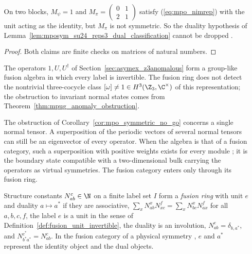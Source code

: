 \begin{lemma}%
    \label{lem:mposym_reps3_non_dual}
    \leanok
    On two blocks, $M_\psi=1$ and
    $M_\pi=\begin{pmatrix}0&1\\2&1\end{pmatrix}$ satisfy
    (\ref{eq:mpo_nimrep}) with the unit acting as the identity, but $M_\pi$
    is not symmetric. So the duality hypothesis of
    Lemma~\ref{lem:mposym_su24_reps3_dual_classification} cannot be dropped
    \cite{gap:glm23_reps3_su24_module_list}.
\end{lemma}

\begin{proof}
    \leanok
    Both claims are finite checks on matrices of natural numbers.
\end{proof}

\begin{example}%
    \label{ex:mpo_symmetry_z3}
    \leanok
    The operators $1,U,U^\dagger$ of
    Section~\ref{sec:asymex_z3anomalous} form a group-like fusion algebra in
    which every label is invertible. The fusion ring does not detect the
    nontrivial three-cocycle class $[\omega]\neq 1\in H^3(\Z_3,\C^\times)$ of
    this representation; the
    obstruction to invariant normal states comes from
    Theorem~\ref{thm:mpug_anomaly_obstruction}.
\end{example}

The obstruction of Corollary~\ref{cor:mpo_symmetric_no_go} concerns a
single normal tensor. A superposition of the periodic vectors of several
normal tensors can still be an eigenvector of every operator. When the
algebra is that of a fusion category, such a superposition with positive
weights exists for every module \cite[Section~5]{GarreRubio2023MPOSym}; it
is the boundary state compatible with a two-dimensional bulk carrying the
operators as virtual symmetries. The fusion category enters only through its
fusion ring.

\begin{definition}%
    \label{def:mposym_fusion_ring}
    \leanok
    Structure constants $N_{ab}^c\in\N$ on a finite label set $I$ form a
    \emph{fusion ring} with unit $e$ and duality $a\mapsto a^*$ if they are
    associative,
    $\sum_xN_{ab}^xN_{xc}^f=\sum_xN_{bc}^xN_{ax}^f$ for all $a,b,c,f$, the
    label $e$ is a unit in the sense of
    Definition~\ref{def:fusion_unit_invertible}, the duality is an
    involution, $N_{ab}^e=\delta_{b,a^*}$, and
    $N_{b^*a^*}^{c^*}=N_{ab}^c$. In the fusion category of a physical
    symmetry \cite[Section~5]{GarreRubio2023MPOSym}, $e$ and $a^*$ represent
    the identity object and the dual objects.
\end{definition}

